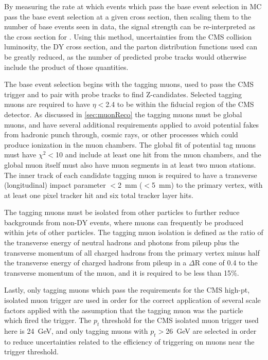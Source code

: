 By measuring the rate at which events which pass the base event selection in MC pass the base event selection at a given cross section, then scaling them to the number of base events seen in data, the signal strength can be re-interpreted as the cross section for \dbrem.
Using this method, uncertainties from the CMS collision luminosity, the DY cross section, and the parton distribution functions used can be greatly reduced, as the number of predicted probe tracks would otherwise include the product of those quantities.

The base event selection begins with the tagging muons, used to pass the CMS trigger and to pair with probe tracks to find Z-candidates.
Selected tagging muons are required to have $\eta<$2.4 to be within the fiducial region of the CMS detector. 
As discussed in \cref{sec:muonReco} the tagging muons must be global muons, and have several additional requirements applied to avoid potential fakes from hadronic punch through, cosmic rays, or other processes which could produce ionization in the muon chambers.
The global fit of potential tag muons must have $\chi^2<$10 and include at least one hit from the muon chambers, and the global muon itself must also have muon segments in at least two muon stations.
The inner track of each candidate tagging muon is required to have a transverse (longitudinal) impact parameter $<$\SI{2}{\milli\meter} ($<$\SI{5}{\milli\meter}) to the primary vertex, with at least one pixel tracker hit and six total tracker layer hits.

The tagging muons must be isolated from other particles to further reduce backgrounds from non-DY events, where muons can frequently be produced within jets of other particles.
The tagging muon isolation is defined as the ratio of the transverse energy of neutral hadrons and photons from pileup plus the transverse momentum of all charged hadrons from the primary vertex minus half the transverse energy of charged hadrons from pileup in a $\Delta$R cone of 0.4 to the transverse momentum of the muon, and it is required to be less than 15$\%$.

Lastly, only tagging muons which pass the requirements for the CMS high-pt, isolated muon trigger are used in order for the correct application of several scale factors applied with the assumption that the tagging muon was the particle which fired the trigger.
The $p_t$ threshold for the CMS isolated muon trigger used here is \SI{24}{\giga\eV}, and only tagging muons with $p_t>$\SI{26}{\giga\eV} are selected in order to reduce uncertainties related to the efficiency of triggering on muons near the trigger threshold.

